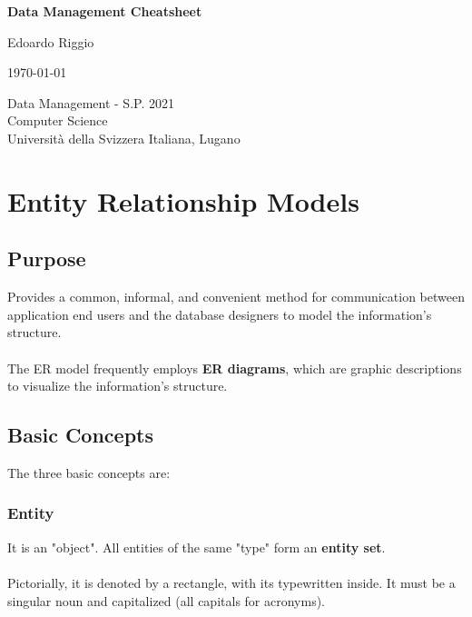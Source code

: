 \documentclass{article}
\begin{document}
\begin{titlepage}
    \begin{center}
        \vspace*{1cm}
        
        \Huge
        \textbf{Data Management Cheatsheet}
        
        \vspace{0.5cm}
        \LARGE
        
        \vspace{.5cm}
        
        Edoardo Riggio
   		  \vspace{1.5cm}
       
        \vfill
        
        \today
        
        \vspace{.8cm}
          \Large
          Data Management - S.P. 2021 \\
        Computer Science\\
        Universit\`{a} della Svizzera Italiana, Lugano\\
        
    \end{center}
\end{titlepage}

\tableofcontents

\newpage

\section{Entity Relationship Models}
\subsection{Purpose}
Provides a common, informal, and convenient method for communication between application end users and the database designers to model the information's structure. \\ \\
The ER model frequently employs \textbf{ER diagrams}, which are graphic descriptions to visualize the information's structure.

\subsection{Basic Concepts}
The three basic concepts are:
\subsubsection{Entity}
It is an "object". All entities of the same "type" form an \textbf{entity set}. \\ \\
Pictorially, it is denoted by a rectangle, with its typewritten inside. It must be a singular noun and capitalized (all capitals for acronyms). \\ \\
\end{document}

